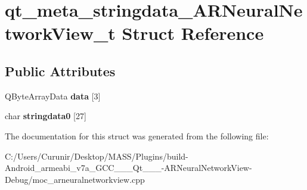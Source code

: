 \hypertarget{structqt__meta__stringdata___a_r_neural_network_view__t}{}\section{qt\+\_\+meta\+\_\+stringdata\+\_\+\+A\+R\+Neural\+Network\+View\+\_\+t Struct Reference}
\label{structqt__meta__stringdata___a_r_neural_network_view__t}
\subsection*{Public Attributes}
\begin{DoxyCompactItemize}
\item 
\mbox{\label{structqt__meta__stringdata___a_r_neural_network_view__t_abd6c9f336d98a97c5df97795a1fe99d8}} 
Q\+Byte\+Array\+Data {\bfseries data} \mbox{[}3\mbox{]}
\item 
\mbox{\label{structqt__meta__stringdata___a_r_neural_network_view__t_acec27ed82b79fa2f9fc5de47a085d347}} 
char {\bfseries stringdata0} \mbox{[}27\mbox{]}
\end{DoxyCompactItemize}


The documentation for this struct was generated from the following file\+:\begin{DoxyCompactItemize}
\item 
C\+:/\+Users/\+Curunir/\+Desktop/\+M\+A\+S\+S/\+Plugins/build-\/\+Android\+\_\+armeabi\+\_\+v7a\+\_\+\+G\+C\+C\+\_\+\_\+\_\+\+Qt\+\_\+\_\+\_-\/\+A\+R\+Neural\+Network\+View-\/\+Debug/moc\+\_\+arneuralnetworkview.\+cpp\end{DoxyCompactItemize}
